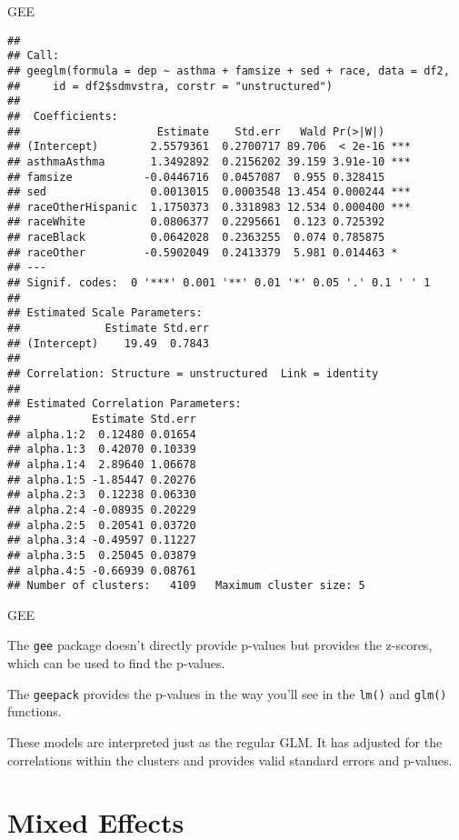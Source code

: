 \begin{frame}[fragile]{GEE}

\tiny

\begin{verbatim}
## 
## Call:
## geeglm(formula = dep ~ asthma + famsize + sed + race, data = df2, 
##     id = df2$sdmvstra, corstr = "unstructured")
## 
##  Coefficients:
##                     Estimate    Std.err   Wald Pr(>|W|)    
## (Intercept)        2.5579361  0.2700717 89.706  < 2e-16 ***
## asthmaAsthma       1.3492892  0.2156202 39.159 3.91e-10 ***
## famsize           -0.0446716  0.0457087  0.955 0.328415    
## sed                0.0013015  0.0003548 13.454 0.000244 ***
## raceOtherHispanic  1.1750373  0.3318983 12.534 0.000400 ***
## raceWhite          0.0806377  0.2295661  0.123 0.725392    
## raceBlack          0.0642028  0.2363255  0.074 0.785875    
## raceOther         -0.5902049  0.2413379  5.981 0.014463 *  
## ---
## Signif. codes:  0 '***' 0.001 '**' 0.01 '*' 0.05 '.' 0.1 ' ' 1
## 
## Estimated Scale Parameters:
##             Estimate Std.err
## (Intercept)    19.49  0.7843
## 
## Correlation: Structure = unstructured  Link = identity 
## 
## Estimated Correlation Parameters:
##           Estimate Std.err
## alpha.1:2  0.12480 0.01654
## alpha.1:3  0.42070 0.10339
## alpha.1:4  2.89640 1.06678
## alpha.1:5 -1.85447 0.20276
## alpha.2:3  0.12238 0.06330
## alpha.2:4 -0.08935 0.20229
## alpha.2:5  0.20541 0.03720
## alpha.3:4 -0.49597 0.11227
## alpha.3:5  0.25045 0.03879
## alpha.4:5 -0.66939 0.08761
## Number of clusters:   4109   Maximum cluster size: 5
\end{verbatim}

\end{frame}

\begin{frame}[fragile]{GEE}

The \texttt{gee} package doesn't directly provide p-values but provides
the z-scores, which can be used to find the p-values.

The \texttt{geepack} provides the p-values in the way you'll see in the
\texttt{lm()} and \texttt{glm()} functions.

These models are interpreted just as the regular GLM. It has adjusted
for the correlations within the clusters and provides valid standard
errors and p-values.

\end{frame}

\section{Mixed Effects}\label{mixed-effects}


